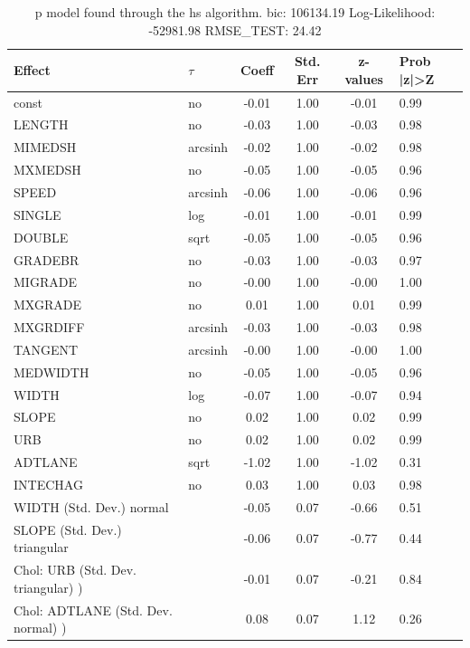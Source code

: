 \begin{table}
	\caption{p model found through the hs algorithm. bic: 106134.19 Log-Likelihood: -52981.98 RMSE_TEST: 24.42}
	\begin{center}
		\begin{tabular}{|l|l|c|c|c|l|}
			\hline
			Effect & $\tau$ & Coeff & Std. Err & z-values & Prob |z|>Z \\
			\hline
			const & no & -0.01 & 1.00 & -0.01 & 0.99 \\
			\hline
			LENGTH & no & -0.03 & 1.00 & -0.03 & 0.98 \\
			\hline
			MIMEDSH & arcsinh & -0.02 & 1.00 & -0.02 & 0.98 \\
			\hline
			MXMEDSH & no & -0.05 & 1.00 & -0.05 & 0.96 \\
			\hline
			SPEED & arcsinh & -0.06 & 1.00 & -0.06 & 0.96 \\
			\hline
			SINGLE & log & -0.01 & 1.00 & -0.01 & 0.99 \\
			\hline
			DOUBLE & sqrt & -0.05 & 1.00 & -0.05 & 0.96 \\
			\hline
			GRADEBR & no & -0.03 & 1.00 & -0.03 & 0.97 \\
			\hline
			MIGRADE & no & -0.00 & 1.00 & -0.00 & 1.00 \\
			\hline
			MXGRADE & no & 0.01 & 1.00 & 0.01 & 0.99 \\
			\hline
			MXGRDIFF & arcsinh & -0.03 & 1.00 & -0.03 & 0.98 \\
			\hline
			TANGENT & arcsinh & -0.00 & 1.00 & -0.00 & 1.00 \\
			\hline
			MEDWIDTH & no & -0.05 & 1.00 & -0.05 & 0.96 \\
			\hline
			WIDTH & log & -0.07 & 1.00 & -0.07 & 0.94 \\
			\hline
			SLOPE & no & 0.02 & 1.00 & 0.02 & 0.99 \\
			\hline
			URB & no & 0.02 & 1.00 & 0.02 & 0.99 \\
			\hline
			ADTLANE & sqrt & -1.02 & 1.00 & -1.02 & 0.31 \\
			\hline
			INTECHAG & no & 0.03 & 1.00 & 0.03 & 0.98 \\
			\hline
			WIDTH (Std. Dev.) normal &  & -0.05 & 0.07 & -0.66 & 0.51 \\
			\hline
			SLOPE (Std. Dev.) triangular &  & -0.06 & 0.07 & -0.77 & 0.44 \\
			\hline
			 Chol: URB (Std. Dev. triangular) ) &  & -0.01 & 0.07 & -0.21 & 0.84 \\
			\hline
			 Chol: ADTLANE (Std. Dev. normal) ) &  & 0.08 & 0.07 & 1.12 & 0.26 \\

\end{tabular}
\end{center}
\end{table}

